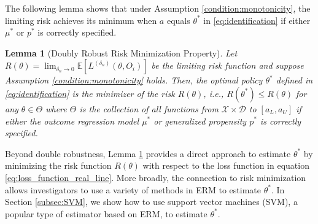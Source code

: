 \documentclass[12pt]{article}
\newtheorem{lemma}{Lemma}%
\newcommand{\E}{\mathbb{E}}
\newcommand{\CP}[1]{{\color{purple}From Chan: #1}}
\newcommand{\XL}[1]{{\color{blue}from Xindi: #1}}
\begin{document}
The following lemma shows that under Assumption \ref{condition:monotonicity}, the limiting risk achieves its minimum when $a$ equals $\theta^*$ in \eqref{eq:identification} if either $\mu^*$ or $p^*$ is correctly specified. 

\begin{lemma}[Doubly Robust Risk Minimization Property]\label{lemma:risk_db} 
  Let $R(\theta) = \lim_{{\delta_n}\rightarrow 0}\E[L^{({\delta_n})}(\theta,O_i)]$ be the limiting risk function and suppose Assumption \ref{condition:monotonicity} holds. Then, the optimal policy $\theta^*$ defined in 
 \eqref{eq:identification} is the minimizer of the risk $R(\theta)$, i.e., $R(\theta^*)\leq R(\theta)$ for any $\theta\in\Theta$ where $\Theta$ is the collection of all functions from $\mathcal{X}\times \mathcal{D}$ to $[a_L,a_U]$ if either the outcome regression model $\mu^*$ or generalized propensity $p^*$ is correctly specified.
\end{lemma}
\noindent Beyond double robustness, Lemma \ref{lemma:risk_db} provides a direct approach to estimate $\theta^*$ by minimizing the risk function $R(\theta)$ with respect to the loss function in equation \eqref{eq:loss_function_real_line}.  More broadly, the connection to risk minimization allows investigators to use a variety of methods in ERM to estimate $\theta^*$. In Section \ref{subsec:SVM}, we show how to use support vector machines (SVM), a popular type of estimator based on ERM, to estimate $\theta^*$.
\noindent 
\end{document}
